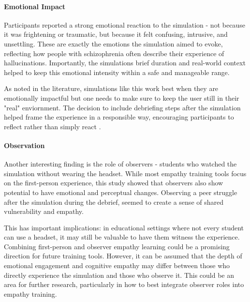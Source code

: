 \paragraph{Emotional Impact}

Participants reported a strong emotional reaction to the simulation - not because it was frightening or traumatic, but because it felt confusing, intrusive, and unsettling. These are exactly the emotions the simulation aimed to evoke, reflecting how people with schizophrenia often describe their experience of hallucinations. Importantly, the simulations brief duration and real-world context helped to keep this emotional intensity within a safe and manageable range.

\vspace{1em}

As noted in the literature, simulations like this work best when they are emotionally impactful but one needs to make sure to keep the user still in their "real" enviornment. The decision to include debriefing steps after the simulation helped frame the experience in a responsible way, encouraging participants to reflect rather than simply react \cite{Rueda2020, Ando2011}.

\paragraph{Observation}

Another interesting finding is the role of observers - students who watched the simulation without wearing the headset. While most empathy training tools focus on the first-person experience, this study showed that observers also show potential to have  emotional and perceptual changes. Observing a peer struggle after the simulation during the debrief, seemed to create a sense of shared vulnerability and empathy.
\vspace{1em}

This has important implications: in educational settings where not every student can use a headset, it may still be valuable to have them witness the experience. Combining first-person and observer empathy learning could be a promising direction for future training tools. However, it can be assumed that the depth of emotional engagement and cognitive empathy may differ between those who directly experience the simulation and those who observe it. This could be an area for further research, particularly in how to best integrate observer roles into empathy training. 

